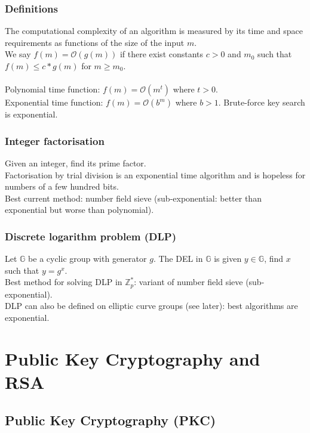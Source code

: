 \documentclass{article}
\begin{document}
\subsubsection{Definitions}

The computational complexity of an algorithm is measured by its time and space requirements as functions of the size of the input $m$.\\
We say $f(m) = \mathcal{O} (g(m))$ if there exist constants $c>0$ and $m_0$ such that $f(m) \leq c * g(m)$ for $m\geq m_0$.\\\\
Polynomial time function: $f(m)=\mathcal{O} (m^t)$ where $t > 0$.\\
Exponential time function: $f(m)=\mathcal{O} (b^m)$ where $b > 1$. Brute-force key search is exponential.\\

\subsubsection{Integer factorisation}

Given an integer, find its prime factor.\\
Factorisation by trial division is an exponential time algorithm and is hopeless for numbers of a few hundred bits.\\
Best current method: number field sieve (sub-exponential: better than exponential but worse than polynomial).

\subsubsection{Discrete logarithm problem (DLP)}

Let $\mathbb{G}$ be a cyclic group with generator $g$. The DEL in $\mathbb{G}$ is given $y \in \mathbb{G}$, find $x$ such that $y=g^x$.\\
Best method for solving DLP in $\mathbb{Z}_p^*$: variant of number field sieve (sub-exponential).\\
DLP can also be defined on elliptic curve groups (see later): best algorithms are exponential.

\newpage \section{Public Key Cryptography and RSA}

\subsection{Public Key Cryptography (PKC)}
\end{document}
